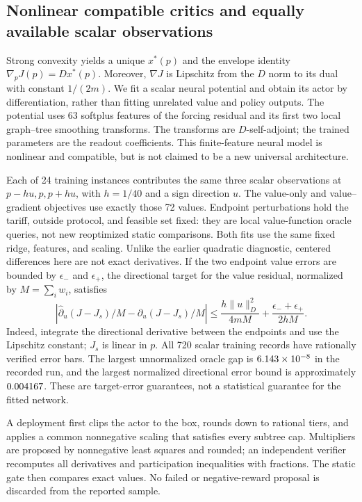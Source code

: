 \subsection{Nonlinear compatible critics and equally available scalar observations}
Strong convexity yields a unique $x^*(p)$ and the envelope identity $\nabla_pJ(p)=Dx^*(p)$. Moreover, $\nabla J$ is Lipschitz from the $D$ norm to its dual with constant $1/(2m)$. We fit a scalar neural potential and obtain its actor by differentiation, rather than fitting unrelated value and policy outputs. The potential uses 63 softplus features of the forcing residual and its first two local graph--tree smoothing transforms. The transforms are $D$-self-adjoint; the trained parameters are the readout coefficients. This finite-feature neural model is nonlinear and compatible, but is not claimed to be a new universal architecture.

Each of 24 training instances contributes the same three scalar observations at $p-hu,p,p+hu$, with $h=1/40$ and a sign direction $u$. The value-only and value--gradient objectives use exactly those 72 values. Endpoint perturbations hold the tariff, outside protocol, and feasible set fixed: they are local value-function oracle queries, not new reoptimized static comparisons. Both fits use the same fixed ridge, features, and scaling. Unlike the earlier quadratic diagnostic, centered differences here are not exact derivatives. If the two endpoint value errors are bounded by $\epsilon_-$ and $\epsilon_+$, the directional target for the value residual, normalized by $M=\sum_iw_i$, satisfies
\begin{equation}\label{eq:r10-fd}
 \left|\widehat\partial_u(J-J_s)/M-\partial_u(J-J_s)/M\right|
 \leq\frac{h\|u\|_D^2}{4mM}+\frac{\epsilon_-+\epsilon_+}{2hM}.
\end{equation}
Indeed, integrate the directional derivative between the endpoints and use the Lipschitz constant; $J_s$ is linear in $p$. All 720 scalar training records have rationally verified error bars. The largest unnormalized oracle gap is $6.143\times10^{-8}$ in the recorded run, and the largest normalized directional error bound is approximately $0.004167$. These are target-error guarantees, not a statistical guarantee for the fitted network.

A deployment first clips the actor to the box, rounds down to rational tiers, and applies a common nonnegative scaling that satisfies every subtree cap. Multipliers are proposed by nonnegative least squares and rounded; an independent verifier recomputes all derivatives and participation inequalities with fractions. The static gate then compares exact values. No failed or negative-reward proposal is discarded from the reported sample.

